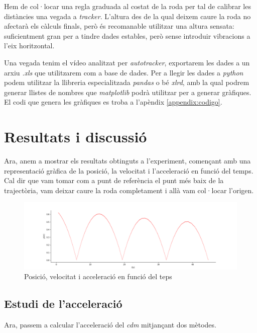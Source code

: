 \documentclass[11pt]{article}
\begin{document}
        \vspace{0.4cm}Hem de col·locar una regla graduada al costat de la roda per tal de calibrar les distàncies una vegada a \textit{tracker}. L'altura des de la qual deixem caure la roda no afectarà els càlculs finals, però és recomanable utilitzar una altura sensata: suficientment gran per a tindre dades estables, però sense introduir vibracions a l'eix horitzontal.

        \vspace{0.4cm}Una vegada tenim el vídeo analitzat per \textit{autotracker}, exportarem les dades a un arxiu \textit{.xls} que utilitzarem com a base de dades. Per a llegir les dades a \textit{python} podem utilitzar la llibreria especialitzada \textit{pandas} o bé \textit{xlrd}, amb la qual podrem generar llistes de nombres que \textit{matplotlib} podrà utilitzar per a generar gràfiques. El codi que genera les gràfiques es troba a l'apèndix \ref{appendix:codigo}.

\section{Resultats i discussió}
    \vspace{0.2cm}
    Ara, anem a mostrar els resultats obtinguts a l'experiment, començant amb una representació gràfica de la posició, la velocitat i l'acceleració en funció del temps. Cal dir que vam tomar com a punt de referència el punt més baix de la trajectòria, vam deixar caure la roda completament i allà vam col·locar l'origen.\\
    \begin{figure}[h]
        \vspace{-0.2cm}
        \begin{center}
            \includegraphics[width=\textwidth]{fotos/posicio.png}
            \caption{Posició, velocitat i acceleració en funció del teps}
        \end{center}
    \end{figure}

    \subsection{Estudi de l'acceleració}
    \vspace{0.4cm}Ara, passem a calcular l'acceleració del \textit{cdm} mitjançant dos mètodes. 
    
\end{document}
